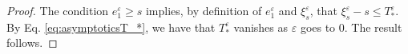 \documentclass[reqno, 12pt, a4paper]{amsart}
\theoremstyle{plain}
\theoremstyle{definition}
\newcommand{\ced}[1]{\todo[author=\textcolor{white}{\bf{Cedric}},inline]{\textcolor{white}{{\textbf{#1}}}}}
\begin{document}
\begin{proof}

The condition $e_1^\varepsilon \ge s$ implies, by definition of $e_1^\varepsilon$ and $\xi_s^\varepsilon$,  that $\xi_s^\varepsilon -s \le T_*^\varepsilon$. By Eq. \eqref{eq:asymptoticsT_*}, we have that $T_*^\varepsilon$ vanishes as $\varepsilon$ goes to $0$. The result follows.



%
%
%
%
%
%
%

\end{proof}
\end{document}
